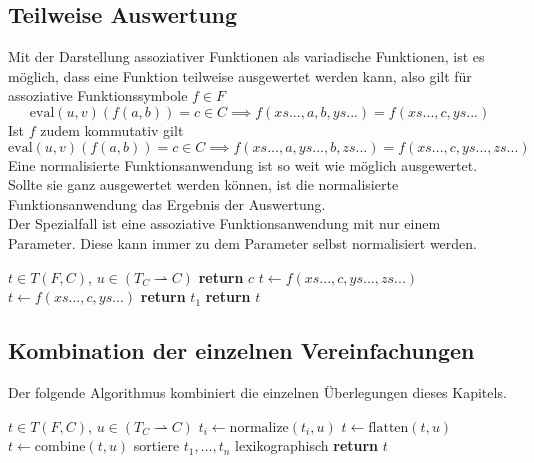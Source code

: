 \documentclass{article}
\begin{document}
\subsection{Teilweise Auswertung}
Mit der Darstellung assoziativer Funktionen als variadische Funktionen, ist es möglich, dass eine Funktion teilweise ausgewertet werden kann, also gilt für assoziative Funktionssymbole $f \in F$
$$\mathrm{eval}(u, v)(f(a, b)) = c \in C \implies f(xs..., a, b, ys...) = f(xs..., c, ys...)$$
Ist $f$ zudem kommutativ gilt 
$$\mathrm{eval}(u, v)(f(a, b)) = c \in C \implies f(xs..., a, ys..., b, zs...) = f(xs..., c, ys..., zs...)$$
Eine normalisierte Funktionsanwendung ist so weit wie möglich ausgewertet. Sollte sie ganz ausgewertet werden können, ist die normalisierte Funktionsanwendung das Ergebnis der Auswertung. \\
Der Spezialfall ist eine assoziative Funktionsanwendung mit nur einem Parameter. Diese kann immer zu dem Parameter selbst normalisiert werden.

\begin{algorithm}
\caption{$\mathrm{combine} \colon T \times (T_C \rightharpoonup C) \rightarrow T$}\label{combine}
\begin{algorithmic}[1] %
\Require $t \in T(F, C)$, $u \in (T_C \rightharpoonup C)$
	\State \textbf{return} $c$ 
			\State $t \leftarrow f(xs..., c, ys..., zs...)$
		\EndWhile
	\Else
			\State $t \leftarrow f(xs..., c, ys...)$
		\EndWhile
	\EndIf
		\State \textbf{return} $t_1$ 
	\EndIf
\EndIf
\State \textbf{return} $t$ 
\end{algorithmic}
\end{algorithm}

\subsection{Kombination der einzelnen Vereinfachungen}
Der folgende Algorithmus kombiniert die einzelnen Überlegungen dieses Kapitels. 

\begin{algorithm}
\caption{$\mathrm{normalize} \colon T \times (T_C \rightharpoonup C) \rightarrow T$}\label{normalize}
\begin{algorithmic}[1] %
\Require $t \in T(F, C)$, $u \in (T_C \rightharpoonup C)$
		\State $t_i \leftarrow \mathrm{normalize}(t_i, u)$
	\EndFor
\EndIf
\State $t \leftarrow \mathrm{flatten}(t, u)$
\State $t \leftarrow \mathrm{combine}(t, u)$
	\State sortiere $t_1, \dots, t_n$ lexikographisch
\EndIf
\State \textbf{return} $t$ 
\end{algorithmic}
\end{algorithm}
\end{document}
